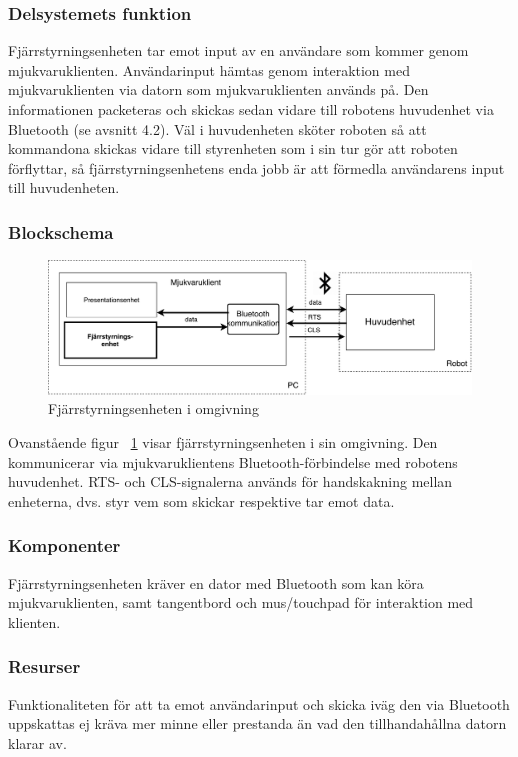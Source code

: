\documentclass{article}
\begin{document}
\subsubsection{Delsystemets funktion}
Fjärrstyrningsenheten tar emot input av en användare som kommer genom mjukvaruklienten. Användarinput hämtas genom interaktion med mjukvaruklienten via datorn som mjukvaruklienten används på. Den informationen packeteras och skickas sedan vidare till robotens huvudenhet via Bluetooth (se avsnitt 4.2). Väl i huvudenheten sköter roboten så att kommandona skickas vidare till styrenheten som i sin tur gör att roboten förflyttar, så fjärrstyrningsenhetens enda jobb är att förmedla användarens input till huvudenheten.


\subsubsection{Blockschema}
\begin{figure}[H]
\centering 
\includegraphics[scale=0.5]{Oversikt_fjarrstyrenhet}
\caption{Fjärrstyrningsenheten i omgivning}
\label{fig:Oversikt_fjarrstyrenhet}
\end{figure}
Ovanstående figur ~\ref{fig:Oversikt_fjarrstyrenhet} visar fjärrstyrningsenheten i sin omgivning. Den kommunicerar via mjukvaruklientens Bluetooth-förbindelse med robotens huvudenhet. RTS- och CLS-signalerna används för handskakning mellan enheterna, dvs. styr vem som skickar respektive tar emot data.  

\subsubsection{Komponenter}
Fjärrstyrningsenheten kräver en dator med Bluetooth som kan köra mjukvaruklienten, samt tangentbord och mus/touchpad för interaktion med klienten. 

\subsubsection{Resurser}
Funktionaliteten för att ta emot användarinput och skicka iväg den via Bluetooth uppskattas ej kräva mer minne eller prestanda än vad den tillhandahållna datorn klarar av.
\end{document}
